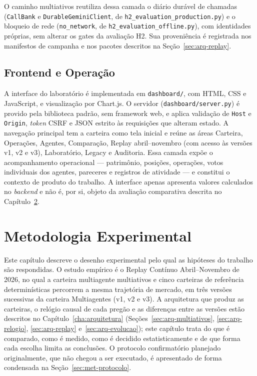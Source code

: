 \documentclass{eic-bcc-tcc}
\begin{document}
O caminho multiativos reutiliza dessa camada o diário durável de chamadas (\texttt{CallBank} e \texttt{DurableGeminiClient}, de \texttt{h2\_evaluation\_production.py}) e o bloqueio de rede (\texttt{no\_network}, de \texttt{h2\_evaluation\_offline.py}), com identidades próprias, sem alterar os gates da avaliação H2. Sua proveniência é registrada nos manifestos de campanha e nos pacotes descritos na Seção~\ref{sec:arq-replay}.

\section{Frontend e Operação}

A interface do laboratório é implementada em \texttt{dashboard/}, com HTML, CSS e JavaScript, e visualização por Chart.js. O servidor (\texttt{dashboard/server.py}) é provido pela biblioteca padrão, sem framework web, e aplica validação de \texttt{Host} e \texttt{Origin}, \textit{token} CSRF e JSON estrito às requisições que alteram estado. A navegação principal tem a carteira como tela inicial e reúne as áreas Carteira, Operações, Agentes, Comparação, Replay abril--novembro (com acesso às versões v1, v2 e v3), Laboratório, Legacy e Auditoria. Essa camada expõe o acompanhamento operacional --- patrimônio, posições, operações, votos individuais dos agentes, pareceres e registros de atividade --- e constitui o contexto de produto do trabalho. A interface apenas apresenta valores calculados no \textit{backend} e não é, por si, objeto da avaliação comparativa descrita no Capítulo~\ref{cha:metodologia}.

\chapter{Metodologia Experimental}
\label{cha:metodologia}

Este capítulo descreve o desenho experimental pelo qual as hipóteses do trabalho são respondidas. O estudo empírico é o Replay Contínuo Abril--Novembro de 2026, no qual a carteira multiagente multiativos e cinco carteiras de referência determinísticas percorrem a mesma trajetória de mercado, em três versões sucessivas da carteira Multiagentes (v1, v2 e v3). A arquitetura que produz as carteiras, o relógio causal de cada pregão e as diferenças entre as versões estão descritos no Capítulo~\ref{cha:arquitetura} (Seções~\ref{sec:arq-multiativos}, \ref{sec:arq-relogio}, \ref{sec:arq-replay} e~\ref{sec:arq-evolucao}); este capítulo trata do que é comparado, como é medido, como é decidido estatisticamente e de que forma cada escolha limita as conclusões. O protocolo confirmatório planejado originalmente, que não chegou a ser executado, é apresentado de forma condensada na Seção~\ref{sec:met-protocolo}.
\end{document}
